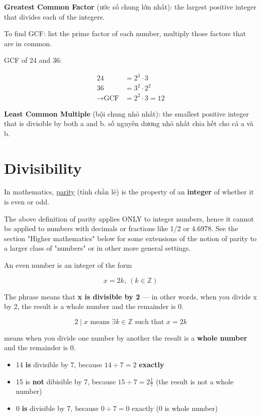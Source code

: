 \vspace{10 mm}

\textbf{Greatest Common Factor} (ước số chung lớn nhất): the largest positive integer that divides each of the integers.

To find GCF: list the prime factor of each number, multiply those factors that are in common.

GCF of 24 and 36:

\[
  \begin{aligned}
    24 &= 2^{3} \cdot 3\\
    36 &= 3^{2} \cdot 2^{2}\\
    \rightarrow \text{GCF} &= 2^{2} \cdot 3 = 12
  \end{aligned}\]
\[\]

\textbf{Least Common Multiple} (bội chung nhỏ nhất): the smallest positive integer that is divisible by both a and b. số nguyên dương nhỏ nhất chia hết cho cả a và b.

\section{Divisibility}

In mathematics, \href{https://en.wikipedia.org/wiki/Parity_%28mathematics%29}{parity} (tính chẳn lẻ) is the property of an \textbf{integer} of whether it is even or odd.

The above definition of parity applies ONLY to integer numbers, hence it cannot be applied to numbers with decimals or fractions like 1/2 or 4.6978. See the section "Higher mathematics" below for some extensions of the notion of parity to a larger class of "numbers" or in other more general settings. 

An even number is an integer of the form

\[x=2k,\ (k \in \mathbb{Z})\]

\vspace{10 mm}

The phrase  means that \textbf{x is divisible by 2} — in other words, when you divide x by 2, the result is a whole number and the remainder is 0.

\[2 \mid x \text{ means } \exists k \in \mathbb{Z} \text{ such that } x = 2k\]

 means when you divide one number by another the result is a \textbf{whole number} and the remainder is 0.

\begin{itemize}
  \item 14 \textbf{is} divisible by 7, because $14 \div 7 = 2$ \textbf{exactly}
  \item 15 is \textbf{not} dibisible by 7, because $15 \div 7 = 2\frac{1}{7}$ (the result is not a whole number)
  \item 0 \textbf{is} divisible by 7, because $0 \div 7 = 0$ exactly (0 is  whole number)
\end{itemize}

